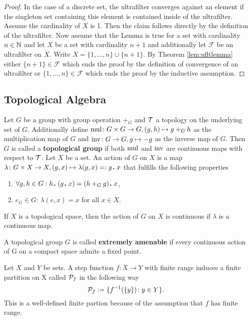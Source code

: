 \begin{proof}
  In the case of a discrete set, the ultrafilter converges against an element if the singleton set containing this element is contained inside of the ultrafilter.
  Assume the cardinality of $X$ is 1. Then the claim follows directly by the definition of the ultrafilter.
Now assume that the Lemma is true for a set with cardinality $n \in \N$ and let $X$ be a set with cardinality $n+1$ and additionally let $\mathcal{F}$ be an ultrafilter on $X$. Write $X = \{1, \ldots, n\} \cup \{n+1\}$. By Theorem \ref{lem:ufltlemma} either $\{n+1\} \in \mathcal{F}$ which ends the proof by the definition of convergence of an ultrafilter or $\{1,\ldots,n\} \in \mathcal{F}$ which ends the proof by the inductive assumption.
\end{proof}

\subsection{Topological Algebra}

\begin{defin}
  Let $G$ be a group with group operation $+_G$ and $\T$ a topology on the underlying set of $G$. Additionally define ${\rm mul}\colon G \times G \to G, (g, h) \mapsto g +_G h$ as the multiplication map of $G$ and ${\rm inv}\colon G \to G, g \mapsto -g$ as the inverse map of $G$. Then $G$ is called a \textbf{topological group} if both ${\rm mul}$ and ${\rm inv}$ are continuous maps with respect to $\T$.
  Let $X$ be a set. An action of $G$ on $X$ is a map $\lambda\colon G\times X \to X, (g, x) \mapsto \lambda(g, x) =: g \anddot x$ that fulfills the following properties
  \begin{enumerate}
    \item $\forall g, h \in G: h \anddot (g \anddot x) = (h +_G g) \anddot x$,
    \item $e_G \in G$: $\lambda(e, x) = x$ for all $x \in X$.
  \end{enumerate}
  If $X$ is a topological space, then the action of $G$ on $X$ is continuous if $\lambda$ is a continuous map.
\end{defin}

\begin{defin}
  A topological group $G$ is called \textbf{extremely amenable} if every continuous action of G on a compact space admits a fixed point.
\end{defin}

\begin{defin}
  Let $X$ and $Y$ be sets. A step function $f\colon X \to Y$ with finite range induces a finite partition on X called $\P_f$ in the following way
  \begin{equation*}
    \P_f := \{f^{-1}(\{y\})\colon y \in Y\}.
  \end{equation*}
  This is a well-defined finite partion because of the assumption that $f$ has finite range.
\end{defin}

